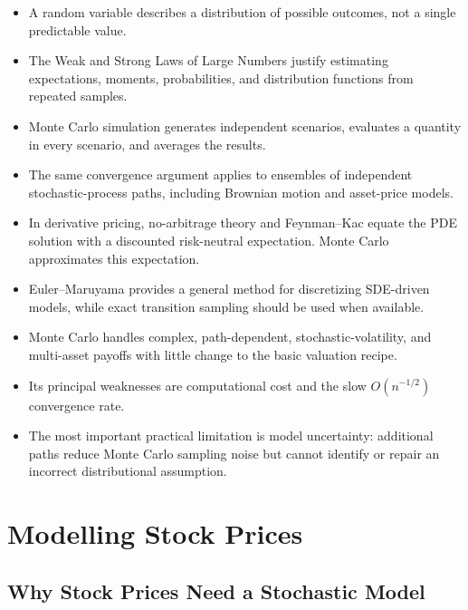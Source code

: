 \documentclass[12pt,openany]{book}
\theoremstyle{definition}
\theoremstyle{remark}
\begin{document}
\begin{itemize}
    \item A random variable describes a distribution of possible outcomes,
    not a single predictable value.

    \item The Weak and Strong Laws of Large Numbers justify estimating
    expectations, moments, probabilities, and distribution functions from
    repeated samples.

    \item Monte Carlo simulation generates independent scenarios, evaluates
    a quantity in every scenario, and averages the results.

    \item The same convergence argument applies to ensembles of independent
    stochastic-process paths, including Brownian motion and asset-price
    models.

    \item In derivative pricing, no-arbitrage theory and Feynman--Kac equate
    the PDE solution with a discounted risk-neutral expectation. Monte Carlo
    approximates this expectation.

    \item Euler--Maruyama provides a general method for discretizing
    SDE-driven models, while exact transition sampling should be used when
    available.

    \item Monte Carlo handles complex, path-dependent, stochastic-volatility,
    and multi-asset payoffs with little change to the basic valuation recipe.

    \item Its principal weaknesses are computational cost and the slow
    \(O(n^{-1/2})\) convergence rate.

    \item The most important practical limitation is model uncertainty:
    additional paths reduce Monte Carlo sampling noise but cannot identify
    or repair an incorrect distributional assumption.
\end{itemize}

\chapter{Modelling Stock Prices}

\section{Why Stock Prices Need a Stochastic Model}
\end{document}
